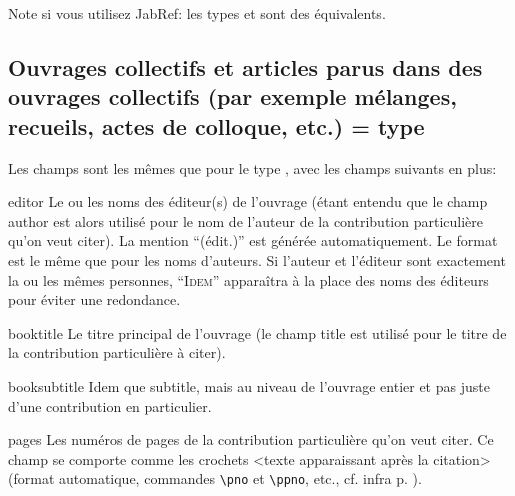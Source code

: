 \documentclass[a4paper]{ltxdockit}[2011/03/25]
\newcommand{\GM}{\enquote}
\begin{document}
Note si vous utilisez JabRef: les types  et  sont des équivalents.

\subsection{Ouvrages collectifs et articles parus dans des ouvrages collectifs (par exemple mélanges, recueils, actes de colloque, etc.) = type }

Les champs sont les mêmes que pour le type , avec les champs suivants en plus:
\begin{marglist}
\item[editor]\label{editor}
Le ou les noms des éditeur(s) de l'ouvrage (étant entendu que le champ author est alors utilisé pour le nom de l'auteur de la contribution particulière qu'on veut citer). La mention \GM{(édit.)} est générée automatiquement. Le format est le même que pour les noms d'auteurs. Si l'auteur et l'éditeur sont exactement la ou les mêmes personnes, \GM{\textsc{Idem}} apparaîtra à la place des noms des éditeurs pour éviter une redondance.
\item[booktitle]\label{booktitle}
Le titre principal de l'ouvrage (le champ title est utilisé pour le titre de la contribution particulière à citer).
\item[booksubtitle]\label{booksubtitle}
Idem que subtitle, mais au niveau de l'ouvrage entier et pas juste d'une contribution en particulier.
\item[pages]\label{pages}
Les numéros de pages de la contribution particulière qu'on veut citer. Ce champ se comporte comme les crochets <texte apparaissant après la citation> (format automatique, commandes \verb/\pno/ et \verb/\ppno/, etc., cf. infra p. \pageref{citation}). 
\end{marglist}
\end{document}

